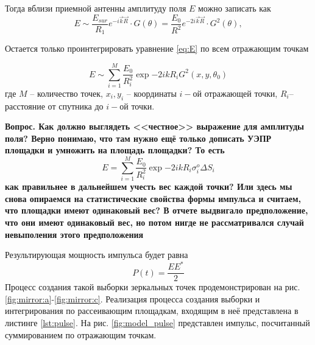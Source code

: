 Тогда вблизи приемной антенны амплитуду поля $E$ можно записать как
\begin{equation}
    \label{eq:E}
    E \sim \frac{E_{sur}}{R_1} e^{-i\vec k \vec R} \cdot G(\theta) =
    \frac{E_0}{R^2} e^{-2i\vec k \vec R} \cdot G^2(\theta), 
\end{equation}

Остается только проинтегрировать уравнение \eqref{eq:E} по всем отражающим
точкам 

\begin{equation}
    \label{eq:}
    E \sim \sum\limits_{i=1}^{M} \frac{E_0}{R_i^2} \exp{-2ikR_i}
    G^2(x,y,\theta_0)
\end{equation}
где $M$ -- количество точек,  $x_i,y_i$ -- координаты  $i-$ой отражающей точки,
 $R_i$-- расстояние от спутника до  $i-$ой точки.

 \textbf{\color{red} {\large Вопрос. Как должно выглядеть <<честное>> выражение
 для амплитуды поля? Верно понимаю, что там нужно ещё только дописать УЭПР
 площадки и умножить на площадь площадки? То есть}
\begin{equation}
    \label{eq:}
    E =  \sum\limits_{i=1}^{M} \frac{E_0}{R_i^2} \exp{-2ikR_i} \sigma^o_i
    \Delta S_i
\end{equation}
 как правильнее в дальнейшем учесть вес каждой точки? Или здесь мы снова
 опираемся на статистические свойства формы импульса и считаем, что площадки
 имеют одинаковый вес? В отчете выдвигало предположение, что они имеют
 одинаковый вес, но потом нигде не рассматривался случай невыполения этого
 предположения}%

 Результирующая мощность импульса будет равна
 \begin{equation}
     \label{eq:}
     P(t) = \frac{EE^*}{2}
 \end{equation}
Процесс создания такой выборки зеркальных точек продемонстрирован на рис.
\ref{fig:mirror:a}-\ref{fig:mirror:c}. 
Реализация процесса создания выборки и интегрирования по рассеивающим
площадкам, входящим в неё представлена в листинге \ref{lst:pulse}.
На рис. \ref{fig:model_pulse} представлен импульс, посчитанный суммированием по отражающим точкам.

